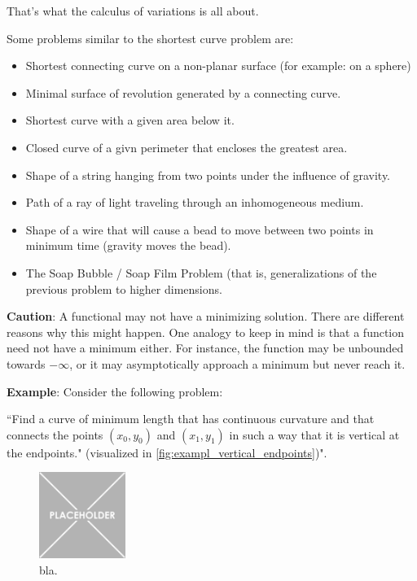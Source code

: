 That's what the calculus of variations is all about. 

\bigbreak

Some problems similar to the shortest curve problem are:
\begin{itemize}
    \item Shortest connecting curve on a non-planar surface (for example: on a sphere)

    \item Minimal surface of revolution generated by a connecting curve. 
    
    \item Shortest curve with a given area below it. 
    
    \item Closed curve of a givn perimeter that encloses the greatest area. 
    
    \item Shape of a string hanging from two points under the influence of gravity. 
    
    \item Path of a ray of light traveling through an inhomogeneous medium. 
    
    \item Shape of a wire that will cause a bead to move between two points in minimum time (gravity moves the bead). 
    
    \item The Soap Bubble / Soap Film Problem (that is, generalizations of the previous problem to higher dimensions. 
\end{itemize}

\bigbreak
\noindent \textbf{Caution}:
A functional may not have a minimizing solution. 
There are different reasons why this might happen. 
One analogy to keep in mind is that a function need not have a minimum either.
For instance, the function may be unbounded towards $-\infty$, or it may asymptotically approach a minimum but never reach it. 

\bigbreak
\noindent \textbf{Example}:
Consider the following problem:

``Find a curve of minimum length that has continuous curvature and that connects the points $(x_0, y_0)$ and $(x_1, y_1)$ in such a way that it is vertical at the endpoints." (visualized in \autoref{fig:exampl_vertical_endpoints})".

\begin{figure}
    \centering
    \includegraphics[width=0.25\textwidth]{figures/placeholder.png}
    \caption{bla.}
    \label{fig:exampl_vertical_endpoints}
\end{figure}

